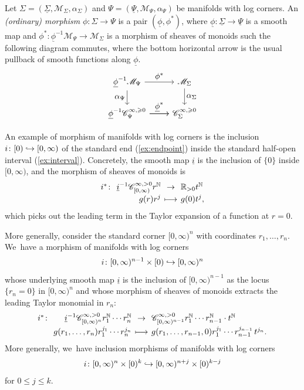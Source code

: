 \documentclass[10pt]{amsart}
\let\tst\textstyle
\newcommand\mto{\mathchoice{\longmapsto}{\mapsto}{\mapsto}{\mapsto}}
\newcommand\hto{\mathrel{\lhook\joinrel\to}}
\newcommand{\mapdef}[5]{\arraycolsep2pt
\begin{array}{crcl}
#1 \colon & #2 &\dpl\to & #3 \\[3pt]
& #4 &\dpl\mto& #5
\end{array}
}
\theoremstyle{definition}
\theoremstyle{remark}
\newenvironment{example}
  {\pushQED{\qed}\renewcommand{\qedsymbol}{$\lozenge$}\examplex}
  {\popQED\endexamplex}
\let\defn\emph
\newcommand{\RR}{\mathbb{R}}
\newcommand{\NN}{\mathbb{N}}
\newcommand{\model}[2]{\halfspc{#1}\times[0)^{#2}}
\newcommand{\halfspc}[1]{[0,\infty)^{#1}}
\renewcommand{\le}{\leqslant}
\renewcommand{\ge}{\geqslant}
\newcommand{\cM}{\mathscr{M}}
\newcommand{\Cinfpos}[1]{\mathscr{C}^{\infty, > 0}_{#1}}
\newcommand{\Cinfge}[1]{\mathscr{C}^{\infty, \ge 0}_{#1}}
\newcommand{\Sig}{\Sigma}
\newcommand{\uSig}{\underline{\Sigma}}
\newcommand{\uPsi}{\underline{\Psi}}
\let\dpl\displaystyle
\begin{document}
\begin{definition}\label{def:morph}
Let $\Sig = (\uSig,\cM_\Sig,\alpha_\Sig)$ and $\Psi = (\uPsi,\cM_\Psi,\alpha_\Psi)$ be manifolds with log corners. An \defn{(ordinary) morphism} $\phi\colon \Sig \to \Psi$ is a pair $(\underline{\phi},\phi^*)$, where $\underline{\phi}\colon \uSig \to \uPsi$ is a smooth map and $\phi^* \colon \underline{\phi}^{-1}\cM_{\Psi} \to \cM_\Sig$ is a morphism of sheaves of monoids such the following diagram commutes, where the bottom horizontal arrow is the usual pullback of smooth functions along $\underline{\phi}$.
\begin{equation}\label{eq:ordinary-commutativity}
\begin{tikzcd}
\underline{\phi}^{-1}\cM_{\Psi} \ar[r,"\tst \phi^*"]\ar[d,"\tst \alpha_\Psi"'] & \cM_{\Sig} \ar[d,"\tst \alpha_\Sig"] \\
\underline{\phi}^{-1}\Cinfge{\Psi} \ar[r,"\tst \underline{\phi}^*"] \ar[r] & \Cinfge{\Sig}
\end{tikzcd}
\end{equation}
\end{definition}

\begin{example}
An example of morphism of manifolds with log corners is the inclusion $i\colon [0)\hto [0,\infty)$ of the standard end (\autoref{ex:endpoint}) inside the standard half-open interval (\autoref{ex:interval}). Concretely, the smooth map $\underline{i}$ is the inclusion of $\{0\}$ inside $[0,\infty)$, and the morphism of sheaves of monoids is
\[
\mapdef{i^*}{\underline{i}^{-1}\Cinfpos{[0,\infty)}r^\NN}{\RR_{>0}t^\NN}
{g(r)r^j}{g(0)t^j,}
\]
which picks out the leading term in the Taylor expansion of a function at $r=0$.
\end{example}

\begin{example}
More generally, consider the standard corner $\halfspc{n}$ with coordinates $r_1,\ldots,r_n$. We~have a morphism of manifolds with log corners
\[
i\colon\halfspc{n-1}\times [0) \hto \halfspc{n}
\]
whose underlying smooth map $\underline{i}$ is the inclusion of $[0,\infty)^{n-1}$ as the locus $\{r_n=0\}$ in $[0,\infty)^n$ and whose morphism of sheaves of monoids extracts the leading Taylor monomial in $r_n$:
\[
\mapdef{i^*}{\underline{i}^{-1}\Cinfpos{\halfspc{n}} r_1^\NN\cdots r_n^\NN}{\Cinfpos{\halfspc{n-1}}r_1^\NN\cdots r_{n-1}^\NN\cdot t^\NN}
{g(r_1,\ldots,r_n)r_1^{j_1}\cdots r_n^{j_n}}{g(r_1,\ldots,r_{n-1},0)r_1^{j_1}\cdots r_{n-1}^{j_{n-1}}\, t^{j_n}.}
\]
More generally, we~have inclusion morphisms of manifolds with log corners
\[
i \colon \model{n}{k} \hto \model{n+j}{k-j}
\]
for $0 \le j \le k$.
\end{example}
\end{document}
